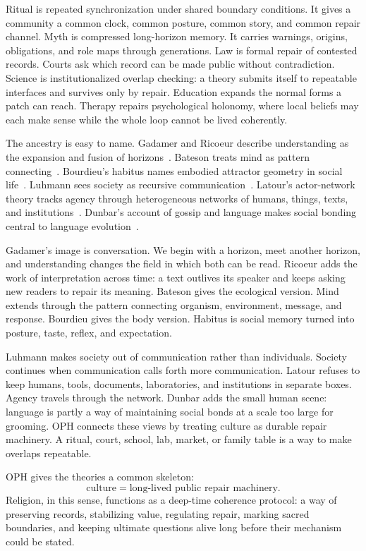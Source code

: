 \documentclass[11pt]{article}
\theoremstyle{remark}
\theoremstyle{plain}
\begin{document}
Ritual is repeated synchronization under shared boundary conditions. It gives a
community a common clock, common posture, common story, and common repair
channel. Myth is compressed long-horizon memory. It carries warnings, origins,
obligations, and role maps through generations. Law is formal repair of
contested records. Courts ask which record can be made public without
contradiction. Science is institutionalized overlap checking: a theory submits
itself to repeatable interfaces and survives only by repair. Education expands
the normal forms a patch can reach. Therapy repairs psychological holonomy,
where local beliefs may each make sense while the whole loop cannot be lived
coherently.

The ancestry is easy to name. Gadamer and Ricoeur describe
understanding as the expansion and fusion of horizons~\cite{Gadamer1960,Ricoeur1984}.
Bateson treats mind as pattern connecting~\cite{Bateson1972}. Bourdieu's
habitus names embodied attractor geometry in social life~\cite{Bourdieu1977}.
Luhmann sees society as recursive communication~\cite{Luhmann1995}. Latour's
actor-network theory tracks agency through heterogeneous networks of humans,
things, texts, and institutions~\cite{Latour2005}. Dunbar's account of gossip
and language makes social bonding central to language evolution~\cite{Dunbar1996}.

Gadamer's image is conversation. We begin with a horizon, meet another horizon,
and understanding changes the field in which both can be read. Ricoeur adds the
work of interpretation across time: a text outlives its speaker and keeps asking
new readers to repair its meaning. Bateson gives the ecological version. Mind
extends through the pattern connecting organism, environment, message, and
response. Bourdieu gives the body version. Habitus is social memory
turned into posture, taste, reflex, and expectation.

Luhmann makes society out of communication rather than individuals. Society
continues when communication calls forth more communication. Latour refuses to
keep humans, tools, documents, laboratories, and institutions in separate boxes.
Agency travels through the network. Dunbar adds the small human scene: language
is partly a way of maintaining social bonds at a scale too large for grooming.
OPH connects these views by treating culture as durable repair machinery. A
ritual, court, school, lab, market, or family table is a way to make overlaps
repeatable.

OPH gives the theories a common skeleton:
\[
\boxed{
\text{culture}=\text{long-lived public repair machinery}.
}
\]
Religion, in this sense, functions as a deep-time coherence protocol: a way of
preserving records, stabilizing value, regulating repair, marking sacred
boundaries, and keeping ultimate questions alive long before their mechanism
could be stated.
\end{document}
